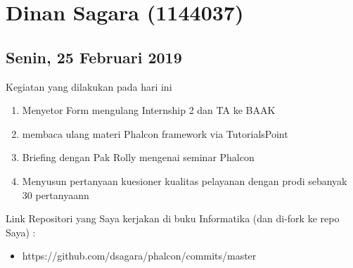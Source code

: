 \chapter{Dinan Sagara (1144037)} 

\section{Senin, 25 Februari 2019}
Kegiatan yang dilakukan pada hari ini
\begin{enumerate}
\item Menyetor Form mengulang Internship 2 dan TA ke BAAK
\item membaca ulang materi Phalcon framework via TutorialsPoint
\item Briefing dengan Pak Rolly mengenai seminar Phalcon
\item Menyusun pertanyaan kuesioner kualitas pelayanan dengan prodi sebanyak 30 pertanyaann
\end{enumerate}

Link Repositori yang Saya kerjakan di buku Informatika (dan di-fork ke repo Saya) :
\begin{itemize}
\item https://github.com/dsagara/phalcon/commits/master
\end{itemize} 